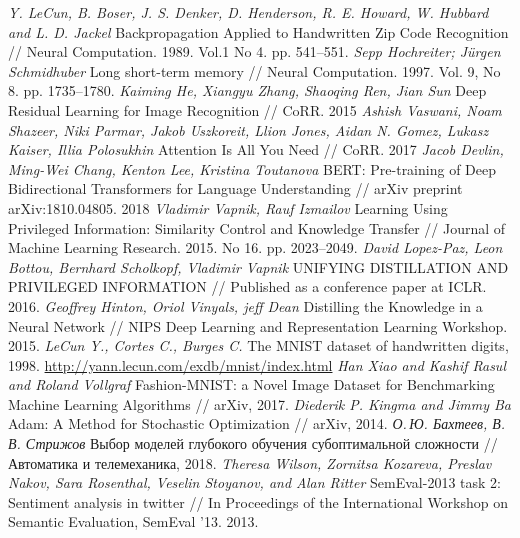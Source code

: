 \documentclass[12pt, twoside]{article}
\begin{document}
\begin{thebibliography}{99}
	\textit{Y. LeCun, B. Boser, J. S. Denker, D. Henderson, R. E. Howard, W. Hubbard and L. D. Jackel} Backpropagation Applied to Handwritten Zip Code Recognition // Neural Computation. 1989. Vol.1 No 4. pp. 541--551.
	\textit{Sepp Hochreiter; Jürgen Schmidhuber} Long short-term memory // Neural Computation. 1997. Vol. 9, No 8.  pp. 1735--1780.
	\textit{Kaiming He, Xiangyu Zhang, Shaoqing Ren, Jian Sun} Deep Residual Learning for Image Recognition // CoRR. 2015
	\textit{Ashish Vaswani, Noam Shazeer, Niki Parmar, Jakob Uszkoreit, Llion Jones, Aidan N. Gomez, Lukasz Kaiser, Illia Polosukhin} Attention Is All You Need // CoRR. 2017
	\textit{Jacob Devlin, Ming-Wei Chang, Kenton Lee, Kristina Toutanova} BERT: Pre-training of Deep Bidirectional Transformers for Language Understanding // arXiv preprint arXiv:1810.04805. 2018
	\textit{Vladimir Vapnik, Rauf Izmailov} Learning Using Privileged Information: Similarity Control and Knowledge Transfer // Journal of Machine Learning Research. 2015. No 16. pp. 2023--2049.
	\textit{David Lopez-Paz, Leon Bottou, Bernhard Scholkopf, Vladimir Vapnik} UNIFYING DISTILLATION
AND PRIVILEGED INFORMATION // Published as a conference paper at ICLR. 2016.
        \textit{Geoffrey Hinton, Oriol Vinyals, jeff Dean} Distilling the Knowledge in a Neural Network // NIPS Deep Learning and Representation Learning Workshop. 2015.
	\textit{LeCun Y.,  Cortes C., Burges C.} The MNIST dataset of handwritten digits, 1998. \url{http://yann.lecun.com/exdb/mnist/index.html}
	\textit{Han Xiao and Kashif Rasul and Roland Vollgraf} Fashion-MNIST: a Novel Image Dataset for Benchmarking Machine Learning Algorithms // arXiv, 2017.
	\textit{Diederik P. Kingma and Jimmy Ba} Adam: A Method for Stochastic Optimization // arXiv, 2014.
	\textit{О.\,Ю. Бахтеев, В.\,В. Стрижов} Выбор моделей глубокого обучения субоптимальной сложности // Автоматика и телемеханика, 2018.
	\textit{Theresa Wilson, Zornitsa Kozareva, Preslav Nakov, Sara Rosenthal, Veselin Stoyanov, and Alan Ritter} SemEval-2013 task 2: Sentiment analysis in twitter // In Proceedings of the International Workshop on Semantic Evaluation, SemEval ’13. 2013.
 \end{thebibliography}
\end{document}
